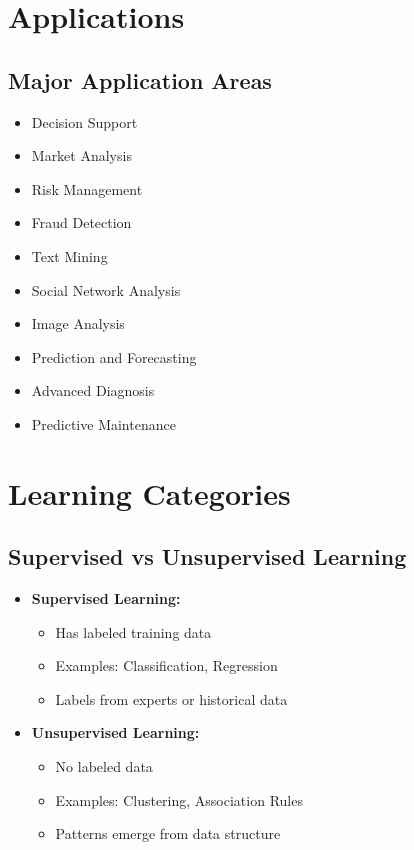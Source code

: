 \section{Applications}

\subsection{Major Application Areas}
\begin{itemize}
    \item Decision Support
    \item Market Analysis
    \item Risk Management
    \item Fraud Detection
    \item Text Mining
    \item Social Network Analysis
    \item Image Analysis
    \item Prediction and Forecasting
    \item Advanced Diagnosis
    \item Predictive Maintenance
\end{itemize}

\section{Learning Categories}

\subsection{Supervised vs Unsupervised Learning}
\begin{itemize}
    \item \textbf{Supervised Learning:}
    \begin{itemize}
        \item Has labeled training data
        \item Examples: Classification, Regression
        \item Labels from experts or historical data
    \end{itemize}
    \item \textbf{Unsupervised Learning:}
    \begin{itemize}
        \item No labeled data
        \item Examples: Clustering, Association Rules
        \item Patterns emerge from data structure
    \end{itemize}
\end{itemize}

